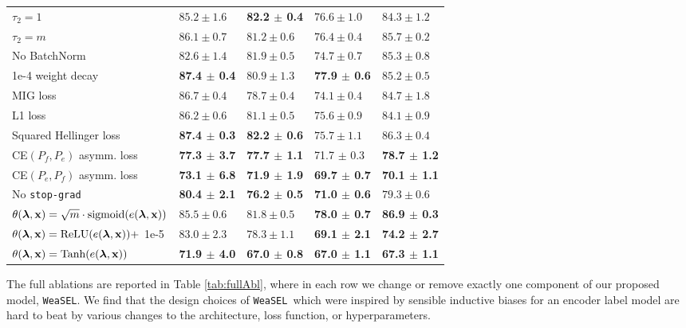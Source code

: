 \documentclass{article}
\newcommand{\weasel}{\texttt{WeaSEL}}\newcommand{\brackets}[1]{\left( #1 \right)}
\newcommand{\features}{\mathbf{x}}
\newcommand{\Abl}[2]{{#1 $\pm$ #2}}
\newcommand{\emphAbl}[2]{{\textbf{#1 $\pm$ #2}}}
\newcommand{\emphBadAbl}[2]{{\color{red}\textbf{#1 $\pm$ #2}}}
\begin{document}
\begin{table}
\begin{tabular}{@{} *5l @{}}
    $\tau_2 = 1$   & 
        $85.2 \pm 1.6$ & \emphAbl{82.2}{0.4} & $76.6 \pm 1.0$ & $84.3 \pm 1.2$\\
    $\tau_2 = m$   & 
        $86.1 \pm 0.7$ & $81.2 \pm 0.6$ & $76.4 \pm 0.4$ & $85.7 \pm 0.2$ \\
    No BatchNorm &
        $82.6 \pm 1.4$ & $81.9 \pm 0.5$ & $74.7 \pm 0.7$ & $85.3 \pm 0.8$ \\
    1e-4 weight decay &
        \emphAbl{87.4}{0.4} & $80.9 \pm 1.3$ & \emphAbl{77.9}{0.6} & $85.2 \pm 0.5$\\
    MIG loss &
        $86.7 \pm 0.4$ & $78.7 \pm 0.4$ & $74.1 \pm 0.4$ & $84.7 \pm 1.8$\\
    L1 loss &
        $86.2 \pm 0.6$ & $81.1 \pm 0.5$ & $75.6 \pm 0.9$ & $84.1 \pm 0.9$\\
    Squared Hellinger loss &
        \emphAbl{87.4}{0.3} & \emphAbl{82.2}{0.6} & $75.7 \pm 1.1$ & $86.3 \pm 0.4$ \\
    CE$\brackets{P_f, P_e}$ asymm. loss &
            \emphBadAbl{77.3}{3.7} & \emphBadAbl{77.7}{1.1} &  \Abl{71.7}{0.3} & \emphBadAbl{78.7}{1.2}\\
    CE$\brackets{P_e, P_f}$ asymm. loss &
            \emphBadAbl{73.1}{6.8} & \emphBadAbl{71.9}{1.9} & \emphBadAbl{69.7}{0.7} & \emphBadAbl{70.1}{1.1}\\
    No \texttt{stop-grad} &
      \emphBadAbl{80.4}{2.1} & \emphBadAbl{76.2}{0.5}  & \emphBadAbl{71.0}{0.6} & $79.3 \pm 0.6$\\
    $\theta(\lfs, \features) = \sqrt{m}\cdot\text{sigmoid}(e(\lfs, \features))$ &
        $85.5 \pm 0.6$ & $81.8 \pm 0.5$ & \emphAbl{78.0}{0.7} & \emphAbl{86.9}{0.3}\\
    $\theta(\lfs, \features) = \text{ReLU}(e(\lfs, \features)) +$ 1e-5 &
        $83.0 \pm 2.3$ & $78.3 \pm 1.1$ & \emphBadAbl{69.1}{2.1} & \emphBadAbl{74.2}{2.7}\\
    $\theta(\lfs, \features) = \text{Tanh}(e(\lfs, \features))$ &
        \emphBadAbl{71.9}{4.0} &  \emphBadAbl{67.0}{0.8} & \emphBadAbl{67.0}{1.1} &  \emphBadAbl{67.3}{1.1} \\
\bottomrule
\end{tabular}
\end{table}
 The full ablations are reported in Table \ref{tab:fullAbl}, where in each row we change or remove exactly one component of our proposed model, \weasel.
We find that the design choices of \weasel\ which were inspired by sensible inductive biases for an encoder label model are hard to beat by various changes to the architecture, loss function, or hyperparameters.
\end{document}
